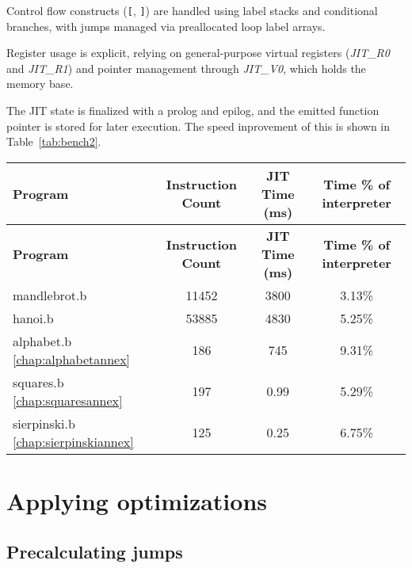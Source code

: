 \par Control flow constructs (\texttt{[}, \texttt{]}) are handled using label stacks and conditional branches, with jumps managed via preallocated loop label arrays.

\par Register usage is explicit, relying on general-purpose virtual registers (\textit{JIT\_R0} and \textit{JIT\_R1}) and pointer management through \textit{JIT\_V0}, which holds the memory base.

\par The JIT state is finalized with a prolog and epilog, and the emitted function pointer is stored for later execution. The speed inprovement of this is shown in Table~\ref{tab:bench2}.

\begin{longtable}{|l|c|c|c|}
\hline
\textbf{Program} & \textbf{Instruction Count} & \textbf{JIT Time (ms)} & \textbf{Time \% of interpreter} \\
\hline
\endfirsthead

\hline
\textbf{Program} & \textbf{Instruction Count} & \textbf{JIT Time (ms)} & \textbf{Time \% of interpreter} \\
\hline
\endhead

\hline
\endfoot

\endlastfoot

mandlebrot.b  & 11452 & 3800  & 3.13\% \\
hanoi.b       & 53885 & 4830  & 5.25\% \\
alphabet.b \ref{chap:alphabetannex}    & 186   & 745   & 9.31\% \\
squares.b \ref{chap:squaresannex}    & 197   & 0.99  & 5.29\% \\
sierpinski.b \ref{chap:sierpinskiannex} & 125   & 0.25  & 6.75\% \\
\hline
\end{longtable}

\vspace{-1em}
\label{tab:bench2}

\section{Applying optimizations}
\label{sec:ch2sec3}

\subsection{Precalculating jumps}
\label{subsec:ch2sec3sec1}


